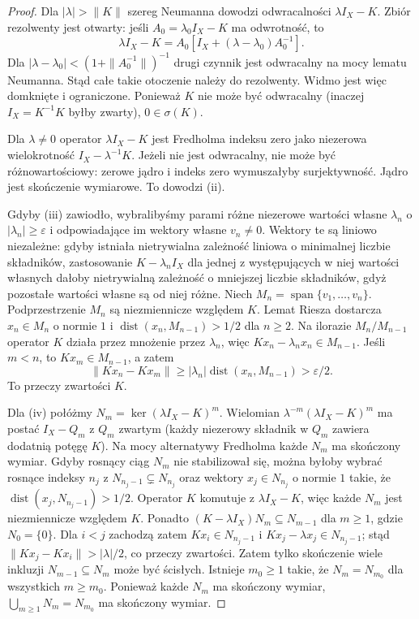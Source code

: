 \begin{proof}
Dla $|\lambda|>\|K\|$ szereg Neumanna dowodzi
odwracalności $\lambda I_X-K$. Zbiór rezolwenty jest otwarty:
jeśli $A_0=\lambda_0 I_X-K$ ma odwrotność, to
\[
\lambda I_X-K=A_0[I_X+(\lambda-\lambda_0)A_0^{-1}].
\]
Dla $|\lambda-\lambda_0|<(1+\|A_0^{-1}\|)^{-1}$
drugi czynnik jest odwracalny na mocy lematu Neumanna.
Stąd całe takie otoczenie należy do rezolwenty.
Widmo jest więc domknięte i ograniczone. Ponieważ
$K$ nie może być odwracalny (inaczej
$I_X=K^{-1}K$ byłby zwarty), $0\in\sigma(K)$.

Dla $\lambda\ne0$ operator $\lambda I_X-K$ jest Fredholma
indeksu zero jako niezerowa wielokrotność $I_X-\lambda^{-1}K$.
Jeżeli nie jest odwracalny, nie może być różnowartościowy:
zerowe jądro i indeks zero wymuszałyby surjektywność.
Jądro jest skończenie wymiarowe. To dowodzi (ii).

Gdyby (iii) zawiodło, wybralibyśmy parami różne
niezerowe wartości własne $\lambda_n$ o
$|\lambda_n|\ge\varepsilon$ i odpowiadające im wektory
własne $v_n\ne0$. Wektory te są liniowo niezależne: gdyby istniała
nietrywialna zależność liniowa o minimalnej liczbie
składników, zastosowanie $K-\lambda_n I_X$ dla jednej
z występujących w niej wartości własnych dałoby
nietrywialną zależność o mniejszej liczbie składników,
gdyż pozostałe wartości własne są od niej różne.
Niech $M_n=\operatorname{span}\{v_1,\ldots,v_n\}$.
Podprzestrzenie $M_n$ są niezmiennicze względem $K$.
Lemat Riesza dostarcza $x_n\in M_n$ o normie $1$ i
$\operatorname{dist}(x_n,M_{n-1})>1/2$ dla $n\ge2$.
Na ilorazie $M_n/M_{n-1}$ operator $K$ działa przez
mnożenie przez $\lambda_n$, więc
$Kx_n-\lambda_nx_n\in M_{n-1}$. Jeśli $m<n$,
to $Kx_m\in M_{n-1}$, a zatem
\[\|Kx_n-Kx_m\|\ge
|\lambda_n|\operatorname{dist}(x_n,M_{n-1})>\varepsilon/2.\]
To przeczy zwartości $K$.

Dla (iv) połóżmy $N_m=\ker(\lambda I_X-K)^m$.
Wielomian $\lambda^{-m}(\lambda I_X-K)^m$ ma postać
$I_X-Q_m$ z $Q_m$ zwartym (każdy niezerowy składnik
w $Q_m$ zawiera dodatnią potęgę $K$). Na mocy
alternatywy Fredholma każde $N_m$ ma skończony wymiar.
Gdyby rosnący ciąg $N_m$ nie stabilizował się, można
byłoby wybrać rosnące indeksy $n_j$ z
$N_{n_j-1}\subsetneq N_{n_j}$ oraz wektory
$x_j\in N_{n_j}$ o normie $1$ takie, że
$\operatorname{dist}(x_j,N_{n_j-1})>1/2$.
Operator $K$ komutuje z $\lambda I_X-K$, więc
każde $N_m$ jest niezmiennicze względem $K$. Ponadto
$(K-\lambda I_X)N_m\subseteq N_{m-1}$ dla $m\ge1$,
gdzie $N_0=\{0\}$. Dla $i<j$ zachodzą zatem
$Kx_i\in N_{n_j-1}$ i $Kx_j-\lambda x_j\in N_{n_j-1}$; stąd
$\|Kx_j-Kx_i\|>|\lambda|/2$, co przeczy zwartości.
Zatem tylko skończenie wiele inkluzji $N_{m-1}\subseteq N_m$
może być ścisłych. Istnieje $m_0\ge1$ takie, że
$N_m=N_{m_0}$ dla wszystkich $m\ge m_0$.
Ponieważ każde $N_m$ ma skończony wymiar,
$\bigcup_{m\ge1}N_m=N_{m_0}$ ma skończony wymiar.
\end{proof}

